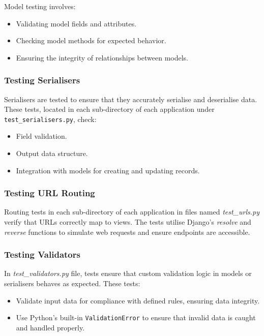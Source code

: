 Model testing involves:
\begin{itemize}
    \item Validating model fields and attributes.
    \item Checking model methods for expected behavior.
    \item Ensuring the integrity of relationships between models.
\end{itemize}

\subsubsection{Testing Serialisers}

Serialisers are tested to ensure that they accurately serialise and deserialise data. These tests, located in each sub-directory of each application under \texttt{test\_serialisers.py}, check:
\begin{itemize}
    \item Field validation.
    \item Output data structure.
    \item Integration with models for creating and updating records.
\end{itemize}

\subsubsection{Testing URL Routing}

Routing tests in each sub-directory of each application in files named \textit{test\_urls.py} verify that URLs correctly map to views. The tests utilise Django's \textit{resolve} and \textit{reverse} functions to simulate web requests and ensure endpoints are accessible.

\subsubsection{Testing Validators}

In \textit{test\_validators.py} file, tests ensure that custom validation logic in models or serialisers behaves as expected. These tests:

\begin{itemize}
    \item Validate input data for compliance with defined rules, ensuring data integrity.
    \item Use Python's built-in \texttt{ValidationError} to ensure that invalid data is caught and handled properly.
\end{itemize}

